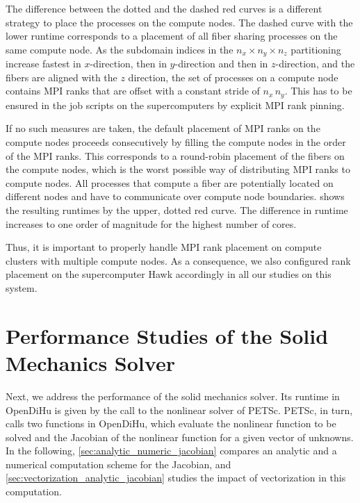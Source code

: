 The difference between the dotted and the dashed red curves is a different strategy to place the processes on the compute nodes. The dashed curve with the lower runtime corresponds to a placement of all fiber sharing processes on the same compute node. As the subdomain indices in the $n_x \times n_y \times n_z$ partitioning increase fastest in $x$-direction, then in $y$-direction and then in $z$-direction, and the fibers are aligned with the $z$ direction, the set of processes on a compute node contains MPI ranks that are offset with a constant stride of $n_x\,n_y$. This has to be ensured in the job scripts on the supercomputers by explicit MPI rank pinning.

If no such measures are taken, the default placement of MPI ranks on the compute nodes proceeds consecutively by filling the compute nodes in the order of the MPI ranks. This corresponds to a round-robin placement of the fibers on the compute nodes, which is the worst possible way of distributing MPI ranks to compute nodes. All processes that compute a fiber are potentially located on different nodes and have to communicate over compute node boundaries.
 shows the resulting runtimes by the upper, dotted red curve. The difference in runtime increases to one order of magnitude for the highest number of cores.

Thus, it is important to properly handle MPI rank placement on compute clusters with multiple compute nodes. As a consequence, we also configured rank placement on the supercomputer Hawk accordingly in all our studies on this system.

%


\section{Performance Studies of the Solid Mechanics Solver}\label{sec:performance_solid_mechanics}


Next, we address the performance of the solid mechanics solver. 
Its runtime in OpenDiHu is given by the call to the nonlinear solver of PETSc. PETSc, in turn, calls two functions in OpenDiHu, which evaluate the nonlinear function to be solved and the Jacobian of the nonlinear function for a given vector of unknowns.
In the following, \cref{sec:analytic_numeric_jacobian} compares an analytic and a numerical computation scheme for the Jacobian, and \cref{sec:vectorization_analytic_jacobian} studies the impact of vectorization in this computation.

